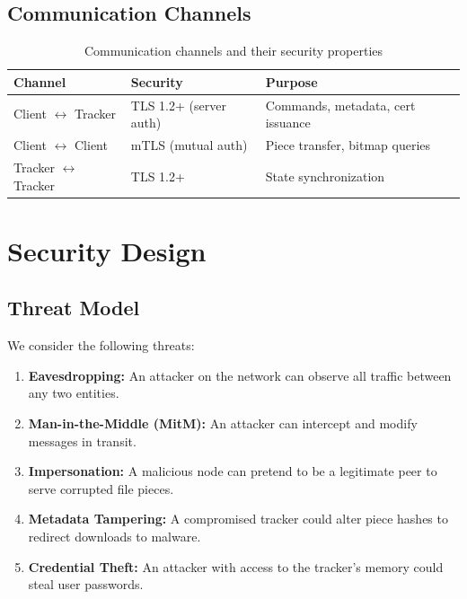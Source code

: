 \documentclass[12pt,a4paper]{article}
\begin{document}
\subsection{Communication Channels}

\begin{table}[h]
\centering
\begin{tabular}{@{}lll@{}}
\toprule
\textbf{Channel} & \textbf{Security} & \textbf{Purpose} \\
\midrule
Client $\leftrightarrow$ Tracker & TLS 1.2+ (server auth) & Commands, metadata, cert issuance \\
Client $\leftrightarrow$ Client & mTLS (mutual auth) & Piece transfer, bitmap queries \\
Tracker $\leftrightarrow$ Tracker & TLS 1.2+ & State synchronization \\
\bottomrule
\end{tabular}
\caption{Communication channels and their security properties}
\end{table}

\section{Security Design}

\subsection{Threat Model}

We consider the following threats:

\begin{enumerate}
    \item \textbf{Eavesdropping:} An attacker on the network can observe all traffic between any two entities.
    \item \textbf{Man-in-the-Middle (MitM):} An attacker can intercept and modify messages in transit.
    \item \textbf{Impersonation:} A malicious node can pretend to be a legitimate peer to serve corrupted file pieces.
    \item \textbf{Metadata Tampering:} A compromised tracker could alter piece hashes to redirect downloads to malware.
    \item \textbf{Credential Theft:} An attacker with access to the tracker's memory could steal user passwords.
\end{enumerate}
\end{document}
